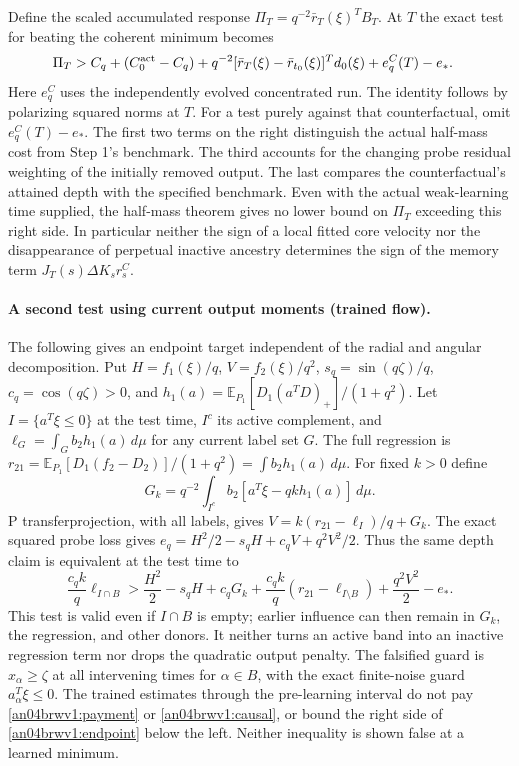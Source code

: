 \documentclass[11pt]{article}
\newcommand{\dd}{\,d}\newcommand{\E}{\mathbb E}
\begin{document}
Define the scaled accumulated response
$\Pi_T=q^{-2}\bar r_T(\xi)^T B_T$. At $T$ the exact test for
beating the coherent minimum becomes
\begin{align}
 \Pi_T>{}&C_q+(C_0^{\rm act}-C_q)
 +q^{-2}[\bar r_T(\xi)-\bar r_{t_0}(\xi)]^Td_0(\xi)
 +e_q^C(T)-e_* .\label{an04brwv1:causal}
\end{align}
Here $e_q^C$ uses the independently evolved concentrated run.
The identity follows by polarizing squared norms at $T$.
For a test purely against that counterfactual, omit $e_q^C(T)-e_*$.
The first two terms on the right distinguish the actual half-mass
cost from Step 1's benchmark. The third accounts for the changing
probe residual weighting of the initially removed output. The
last compares the counterfactual's attained depth with the specified
benchmark. Even with the actual weak-learning time supplied,
the half-mass theorem gives no lower bound on $\Pi_T$ exceeding
this right side. In particular neither the sign of a local fitted
core velocity nor the disappearance of perpetual inactive ancestry
determines the sign of the memory term $J_T(s)\Delta K_s r_s^C$.

\paragraph{A second test using current output moments (trained flow).}
The following gives an endpoint target independent of the radial
and angular decomposition. Put $H=f_1(\xi)/q$, $V=f_2(\xi)/q^2$,
$s_q=\sin(q\zeta)/q$, $c_q=\cos(q\zeta)>0$, and
$h_1(a)=\E_{P_1}[D_1(a^TD)_+]/(1+q^2)$.
Let $I=\{a^T\xi\le0\}$ at the test time, $I^c$ its active complement,
and $\ell_G=\int_G b_2 h_1(a)\dd\mu$ for any current label set $G$.
The full regression is $r_{21}=\E_{P_1}[D_1(f_2-D_2)]/(1+q^2)
=\int b_2h_1(a)\dd\mu$. For fixed $k>0$ define
\[
 G_k=q^{-2}\int_{I^c} b_2[a^T\xi-qk h_1(a)]\dd\mu .
\]
P transferprojection, with all labels, gives
$V=k(r_{21}-\ell_I)/q+G_k$. The exact squared probe loss gives
$e_q=H^2/2-s_qH+c_q V+q^2V^2/2$. Thus the same depth claim is
equivalent at the test time to
\begin{equation}\label{an04brwv1:endpoint}
 \frac{c_q k}{q}\ell_{I\cap B}>
 \frac{H^2}{2}-s_qH+c_qG_k+
 \frac{c_q k}{q}(r_{21}-\ell_{I\setminus B})+
 \frac{q^2V^2}{2}-e_* .
\end{equation}
This test is valid even if $I\cap B$ is empty; earlier influence
can then remain in $G_k$, the regression, and other donors. It neither
turns an active band into an inactive regression term nor drops the
quadratic output penalty. The falsified guard is
$x_\alpha\ge\zeta$ at all intervening times for $\alpha\in B$,
with the exact finite-noise guard $a_\alpha^T\xi\le0$.
The trained estimates through the pre-learning interval do not pay
\eqref{an04brwv1:payment} or \eqref{an04brwv1:causal}, or bound the right side of
\eqref{an04brwv1:endpoint} below the left. Neither inequality
is shown false at a learned minimum.
\end{document}
